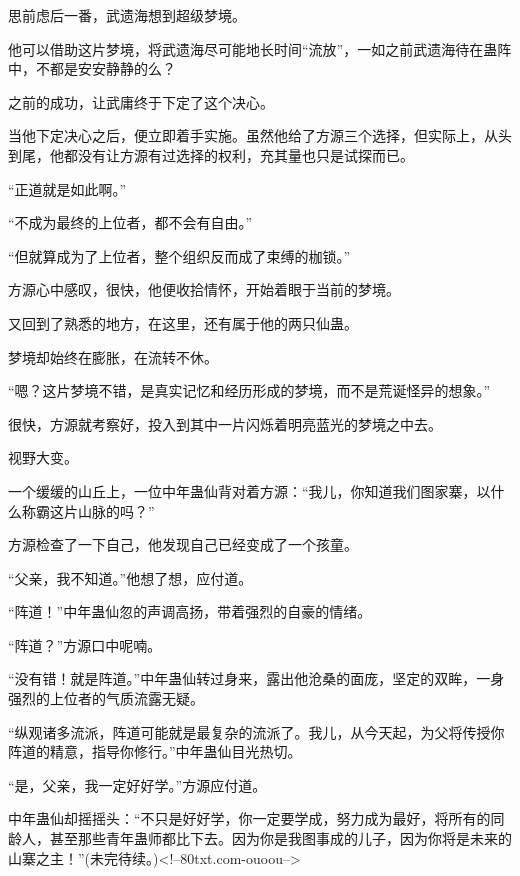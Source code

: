 \begin{this_body}
思前虑后一番，武遗海想到超级梦境。

他可以借助这片梦境，将武遗海尽可能地长时间“流放”，一如之前武遗海待在蛊阵中，不都是安安静静的么？

之前的成功，让武庸终于下定了这个决心。

当他下定决心之后，便立即着手实施。虽然他给了方源三个选择，但实际上，从头到尾，他都没有让方源有过选择的权利，充其量也只是试探而已。

“正道就是如此啊。”

“不成为最终的上位者，都不会有自由。”

“但就算成为了上位者，整个组织反而成了束缚的枷锁。”

方源心中感叹，很快，他便收拾情怀，开始着眼于当前的梦境。

又回到了熟悉的地方，在这里，还有属于他的两只仙蛊。

梦境却始终在膨胀，在流转不休。

“嗯？这片梦境不错，是真实记忆和经历形成的梦境，而不是荒诞怪异的想象。”

很快，方源就考察好，投入到其中一片闪烁着明亮蓝光的梦境之中去。

视野大变。

一个缓缓的山丘上，一位中年蛊仙背对着方源：“我儿，你知道我们图家寨，以什么称霸这片山脉的吗？”

方源检查了一下自己，他发现自己已经变成了一个孩童。

“父亲，我不知道。”他想了想，应付道。

“阵道！”中年蛊仙忽的声调高扬，带着强烈的自豪的情绪。

“阵道？”方源口中呢喃。

“没有错！就是阵道。”中年蛊仙转过身来，露出他沧桑的面庞，坚定的双眸，一身强烈的上位者的气质流露无疑。

“纵观诸多流派，阵道可能就是最复杂的流派了。我儿，从今天起，为父将传授你阵道的精意，指导你修行。”中年蛊仙目光热切。

“是，父亲，我一定好好学。”方源应付道。

中年蛊仙却摇摇头：“不只是好好学，你一定要学成，努力成为最好，将所有的同龄人，甚至那些青年蛊师都比下去。因为你是我图事成的儿子，因为你将是未来的山寨之主！”(未完待续。)<!--80txt.com-ouoou-->

\end{this_body}

